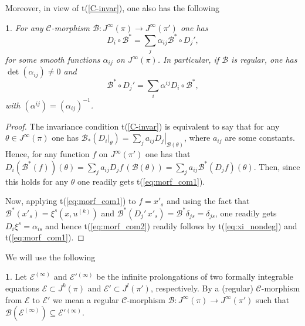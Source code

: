 \documentclass[12pt,english]{elsarticle}
\theoremstyle{plain}
\theoremstyle{plain}
\theoremstyle{remark}
\theoremstyle{plain}
\newtheorem{lem}[thm]{\protect\lemmaname}
\theoremstyle{definition}
\newtheorem{defn}[thm]{\protect\definitionname}
\theoremstyle{definition}
\providecommand{\definitionname}{Definition}
\providecommand{\lemmaname}{Lemma}
\begin{document}
%
  Moreover, in view of t{(\ref{C-invar})}, one also has the following
%
\begin{lem}
\label{lem4}
For any $\mathcal{C}$-morphism
$\mathcal{B}:J^{\infty}(\pi )\rightarrow J^{\infty}(\pi ')$ one has
%
\begin{equation}
D_{i}\circ \mathcal{B}^{*}=\sum _{j}\alpha _{ij}\mathcal{B}^{*}\circ D_{j}',
\label{eq:morf_com1}
\end{equation}
%
for some smooth functions $\alpha _{ij}$ on $J^{\infty}(\pi )$. In particular,
if $\mathcal{B}$ is regular, one has
$\det \left (\alpha _{ij}\right )\neq 0$ and
%
\begin{equation}
\mathcal{B}^{*}\circ D_{j}'=\sum _{i}\alpha ^{ij}D_{i}\circ
\mathcal{B}^{*},
\label{eq:morf_com2}
\end{equation}
%
with $(\alpha ^{ij})=(\alpha _{ij})^{-1}$.
\end{lem}

\begin{proof}
The invariance condition t{(\ref{C-invar})} is equivalent to say that for
any $\theta \in J^{\infty}(\pi )$ one has
$\mathcal{B}_{*}(\left .D_{i}\right |_{\theta})=\sum _{j}a_{ij}\left .D_{j}
\right |_{\mathcal{B}(\theta )}$, where $a_{ij}$ are some constants. Hence,
for any function $f$ on $J^{\infty}(\pi ')$ one has that
$D_{i}\left (\mathcal{B}^{*}(f)\right )(\theta )=\sum _{j}a_{ij}D_{j}f
\,(\mathcal{B}(\theta ))=\sum _{j}a_{ij}\mathcal{B}^{*}\left (D_{j}f
\right )(\theta )$. Then, since this holds for any $\theta $ one readily
gets t{(\ref{eq:morf_com1})}.

Now, applying t{(\ref{eq:morf_com1})} to $f=x'_{s}$ and using the fact that
$\mathcal{B}^{*}\left (x'_{s}\right )=\xi ^{s}\left (x,u^{(k)}\right )$
and
$\mathcal{B}^{*}\left (D_{j}'\,x'_{s}\right )=\mathcal{B}^{*}\delta _{js}=
\delta _{js}$, one readily gets $D_{i}\xi ^{s}=\alpha _{is}$ and hence
t{(\ref{eq:morf_com2})} readily follows by t{(\ref{eq:xi_nondeg})} and t{(\ref{eq:morf_com1})}.
\end{proof}
%
We will use the following
%
\begin{defn}
\label{defn5}
Let $\mathcal{E}^{(\infty )}$ and $\mathcal{E}'{}^{(\infty )}$ be the infinite
prolongations of two formally integrable equations
$\mathcal{E}\subset J^{k}(\pi )$ and
$\mathcal{E}'\subset J^{l}(\pi ')$, respectively. By a (regular)
$\mathcal{C}$-morphism from $\mathcal{E}$ to $\mathcal{E}'$ we mean a regular
$\mathcal{C}$-morphism
$\mathcal{B}:J^{\infty}(\pi )\rightarrow J^{\infty}(\pi ')$ such that
$\mathcal{B}(\mathcal{E}^{(\infty )})\subseteq \mathcal{E}'{}^{(
\infty )}$.
\end{defn}
\end{document}

